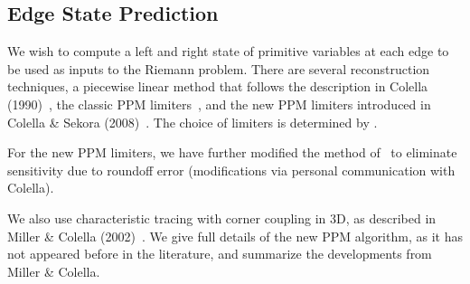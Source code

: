 \subsection{Edge State Prediction}
We wish to compute a left and right state of primitive variables at
each edge to be used as inputs to the Riemann problem.  There
are several reconstruction techniques, a piecewise
linear method that follows the description in Colella (1990)~\cite{colella:1990},
the classic PPM limiters~\cite{ppm}, and the new PPM limiters introduced
in Colella \& Sekora (2008)~\cite{colellasekora}.  The choice of
limiters is determined by .

For the new PPM limiters, we have further modified the method
of~\cite{colellasekora} to eliminate sensitivity due to roundoff error
(modifications via personal communication with Colella).

We also use characteristic tracing with corner coupling in 3D, as
described in Miller \& Colella (2002)~\cite{millercolella:2002}.  We
give full details of the new PPM algorithm, as it has not appeared before
in the literature, and summarize the developments from Miller \&
Colella.

